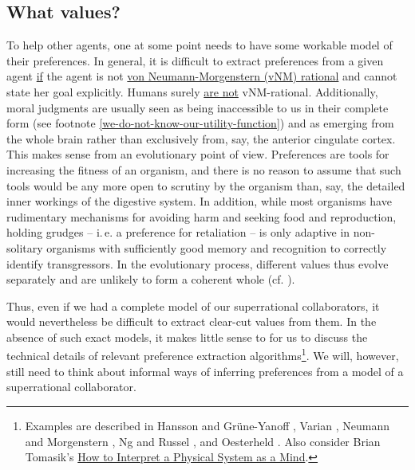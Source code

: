\hypertarget{what-values}{\subsection{What values?}\label{what-values}}

To help other agents, one at some point needs to have some workable
model of their preferences. In general, it is difficult to extract
preferences from a given agent
\href{http://lesswrong.com/lw/h45/we_dont_have_a_utility_function/}{if}
the agent is not
\href{https://en.wikipedia.org/wiki/Von_Neumann\%E2\%80\%93Morgenstern_utility_theorem}{von
Neumann-Morgenstern (vNM) rational} and cannot state her goal
explicitly. Humans surely
\href{https://en.wikipedia.org/wiki/Cognitive_bias}{are not}
vNM-rational. Additionally, moral judgments are usually seen as being
inaccessible to us in their complete form (see footnote
\ref{we-do-not-know-our-utility-function}) and as emerging from the whole
brain rather than exclusively from, say, the anterior cingulate cortex.
This makes sense from an evolutionary point of view. Preferences are
tools for increasing the fitness of an organism, and there is no reason
to assume that such tools would be any more open to scrutiny by the
organism than, say, the detailed inner workings of the digestive system.
In addition, while most organisms have rudimentary mechanisms for
avoiding harm and seeking food and reproduction, holding grudges -- i.\,e.
a preference for retaliation -- is only adaptive in non-solitary
organisms with sufficiently good memory and recognition to correctly
identify transgressors. In the evolutionary process, different values
thus evolve separately and are unlikely to form a coherent whole (cf.
\cite{Dennett1991-es,Kurzban2012-vt}).

Thus, even if we had a complete model of our superrational
collaborators, it would nevertheless be difficult to extract clear-cut
values from them. In the absence of such exact models, it makes little
sense to for us to discuss the technical details of relevant preference
extraction algorithms\footnote{\label{fn:prefs} \label{ftn:preference-extraction} Examples are described in Hansson and Grüne-Yanoff
\citeyear{Hansson2012-um}, Varian \citeyear{Varian2006-vw}, Neumann and Morgenstern
\citeyear{Von_Neumann1953-mc}, Ng and Russel \citeyear{Ng2000-xw}, and Oesterheld
\citeyear{Oesterheld2016-bh}. Also consider Brian
    Tomasik's \href{http://reducing-suffering.org/interpret-physical-system-mind/}{How to Interpret
    a Physical System as a Mind}.}.  We will, however, still need to think about informal ways of
    inferring preferences from a model of a superrational collaborator.

